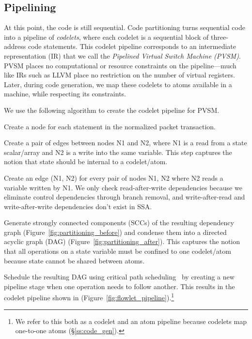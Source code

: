 \subsection{Pipelining}
\label{ss:partitioning}
At this point, the code is still sequential. Code partitioning turns sequential
code into a pipeline of \textit{codelets}, where each codelet is a sequential
block of three-address code statements. This codelet pipeline corresponds to an
intermediate representation (IR) that we call the \textit{Pipelined Virtual
Switch Machine (PVSM)}. PVSM places no computational or resource constraints
on the pipeline---much like IRs such as LLVM place no restriction on the
number of virtual registers. Later, during code generation, we map these
codelets to atoms available in a \absmachine machine, while respecting its
constraints.

We use the following algorithm to create the codelet pipeline for PVSM.
\begin{CompactEnumerate}
  \item Create a node for each statement in the normalized packet transaction.
  \item Create a pair of edges between nodes N1 and N2, where N1 is a read from
    a state scalar/array and N2 is a write into the same variable.  This step
    captures the notion that state should be internal to a codelet/atom.
  \item Create an edge (N1, N2) for every pair of nodes N1, N2 where N2 reads a
    variable written by N1. We only check read-after-write dependencies because
    we eliminate control dependencies through branch removal, and
    write-after-read and write-after-write dependencies don't exist in SSA.
  \item Generate strongly connected components (SCCs) of the resulting dependency
    graph (Figure~\ref{fig:partitioning_before})
    and condense them into a directed acyclic graph (DAG) (Figure~\ref{fig:partitioning_after}).
    This captures the notion that all
    operations on a state variable must be confined to one codelet/atom because
    state cannot be shared between atoms.
  \item Schedule the resulting DAG using critical path
    scheduling~\cite{crit_path_sched} by creating a new pipeline stage when one
    operation needs to follow another. This results in the codelet pipeline
    shown in (Figure~\ref{fig:flowlet_pipeline}).\footnote{We refer to this both
      as a codelet and an atom pipeline because codelets map one-to-one atoms
    (\S\ref{ss:code_gen}).}
\end{CompactEnumerate}

